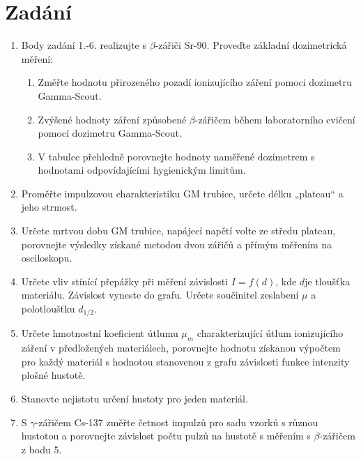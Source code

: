 \documentclass[fleqn]{protokol}
\begin{document}
\section{Zadání}\label{kap:zadani}
    \begin{enumerate}
        \item Body zadání 1.-6. realizujte s $\beta$-zářiči Sr-90. Proveďte základní dozimetrická měření:
        
            \begin{enumerate}
                \item Změřte hodnotu přirozeného pozadí ionizujícího záření pomoci dozimetru Gamma-Scout.
                
                \item Zvýšené hodnoty záření způsobené $\beta$-zářičem během laboratorního cvičení pomocí dozimetru Gamma-Scout.
            
                \item V tabulce přehledně porovnejte hodnoty naměřené dozimetrem s hodnotami odpovídajícími hygienickým limitům.
            \end{enumerate}
           
        \item Proměřte impulzovou charakteristiku GM trubice, určete délku „plateau“ \linebreak a jeho strmost.

        \item Určete mrtvou dobu GM trubice, napájecí napětí volte ze středu plateau, porovnejte výsledky získané metodou dvou zářičů a přímým měřením na osciloskopu.

        \item Určete vliv stínící přepážky při měření závislosti $I = f(d)$, kde $d$\linebreak je tloušťka materiálu. Závislost vyneste do grafu. Určete součinitel zeslabení $\mu$  \linebreak a polotloušťku $d_{1/2}$.

        \item Určete hmotnostní koeficient útlumu $\mu_m$ charakterizující útlum ionizujícího záření v předložených materiálech, porovnejte hodnotu získanou výpočtem pro každý materiál s hodnotou stanovenou z grafu závislosti funkce intenzity \linebreak plošné hustotě.

        \item Stanovte nejistotu určení hustoty pro jeden materiál.

        \item S $\gamma$-zářičem Cs-137 změřte četnost impulzů pro sadu vzorků s různou hustotou \linebreak a porovnejte závislost počtu pulzů na hustotě s měřením s $\beta$-zářičem \linebreak z bodu 5.

    \end{enumerate}
\end{document}
